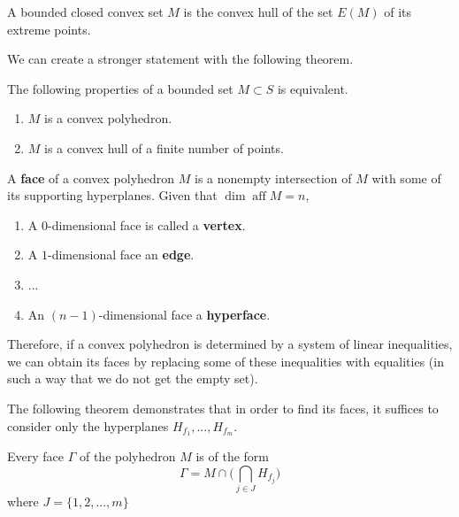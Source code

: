 \documentclass{article}
\DeclareMathOperator{\aff}{aff}
\begin{document}
    \begin{theorem}
      A bounded closed convex set $M$ is the convex hull of the set $E(M)$ of its extreme points. 
    \end{theorem}

    We can create a stronger statement with the following theorem. 

    \begin{theorem}
      The following properties of a bounded set $M \subset S$ is equivalent.
      \begin{enumerate}
        \item $M$ is a convex polyhedron. 
        \item $M$ is a convex hull of a finite number of points. 
      \end{enumerate}
    \end{theorem}

    \begin{definition}
      A \textbf{face} of a convex polyhedron $M$ is a nonempty intersection of $M$ with some of its supporting hyperplanes. Given that $\dim \aff M = n$, 
      \begin{enumerate}
        \item A $0$-dimensional face is called a \textbf{vertex}. 
        \item A $1$-dimensional face an \textbf{edge}. 
        \item ...
        \item An $(n-1)$-dimensional face a \textbf{hyperface}. 
      \end{enumerate}
    \end{definition}

    Therefore, if a convex polyhedron is determined by a system of linear inequalities, we can obtain its faces by replacing some of these inequalities with equalities (in such a way that we do not get the empty set). 

    The following theorem demonstrates that in order to find its faces, it suffices to consider only the hyperplanes $H_{f_1}, ..., H_{f_m}$. 

    \begin{theorem}
      Every face $\Gamma$ of the polyhedron $M$ is of the form
      \begin{equation}
        \Gamma = M \cap \bigg( \bigcap_{j \in J} H_{f_j} \bigg)
      \end{equation}
      where $J = \{1, 2, ..., m\}$
    \end{theorem}
\end{document}
